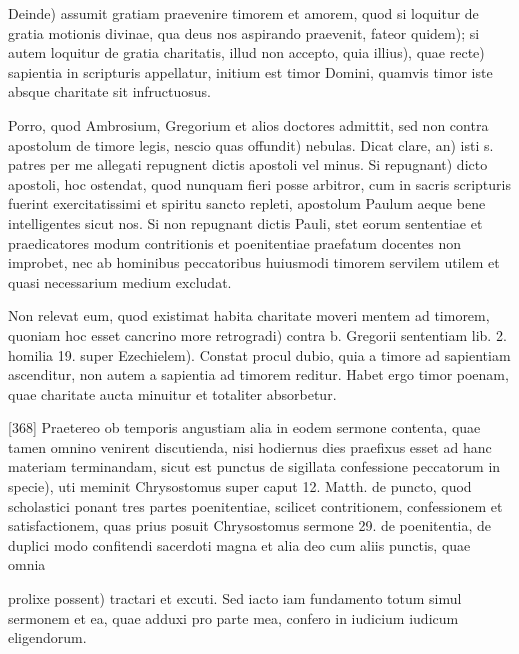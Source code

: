 Deinde) assumit gratiam praevenire timorem et amorem, quod si loquitur de gratia motionis divinae, qua deus nos aspirando praevenit, fateor quidem); si autem loquitur de gratia charitatis, illud non accepto, quia illius), quae recte) sapientia in scripturis appellatur, initium est timor Domini, quamvis timor iste absque charitate sit infructuosus.

Porro, quod Ambrosium, Gregorium et alios doctores admittit, sed non contra apostolum de timore legis, nescio quas offundit) nebulas. Dicat clare, an) isti s. patres per me allegati repugnent dictis apostoli vel minus. Si repugnant) dicto apostoli, hoc ostendat, quod nunquam fieri posse arbitror, cum in sacris scripturis fuerint exercitatissimi et spiritu sancto repleti, apostolum Paulum aeque bene intelligentes sicut nos. Si non repugnant dictis Pauli, stet eorum sententiae et praedicatores modum contritionis et poenitentiae praefatum docentes non improbet, nec ab hominibus peccatoribus huiusmodi timorem servilem utilem et quasi necessarium medium excludat.

Non relevat eum, quod existimat habita charitate moveri mentem ad timorem, quoniam hoc esset cancrino more retrogradi) contra b. Gregorii sententiam lib. 2. homilia 19. super Ezechielem). Constat procul dubio, quia a timore ad sapientiam ascenditur, non autem a sapientia ad timorem reditur. Habet ergo timor poenam, quae charitate aucta minuitur et totaliter absorbetur.

[368] Praetereo ob temporis angustiam alia in eodem sermone contenta, quae tamen omnino venirent discutienda, nisi hodiernus dies praefixus esset ad hanc materiam terminandam, sicut est punctus de sigillata confessione peccatorum in specie), uti meminit Chrysostomus super caput 12. Matth. de puncto, quod scholastici ponant tres partes poenitentiae, scilicet contritionem, confessionem et satisfactionem, quas prius posuit Chrysostomus sermone 29. de poenitentia, de duplici modo confitendi sacerdoti magna et alia deo cum aliis punctis, quae omnia

prolixe possent) tractari et excuti. Sed iacto iam fundamento totum simul sermonem et ea, quae adduxi pro parte mea, confero in iudicium iudicum eligendorum.


